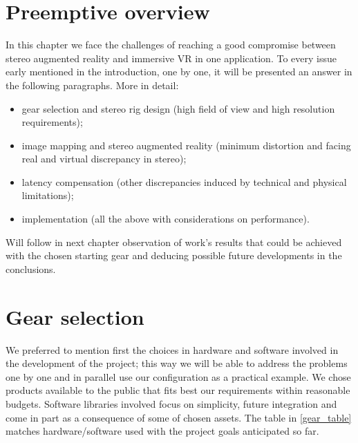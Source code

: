 
\section{Preemptive overview}
In this chapter we face the challenges of reaching a good compromise between stereo augmented reality and immersive VR in one application. To every issue early mentioned in the introduction, one by one, it will be presented an answer in the following paragraphs. More in detail:
\begin{itemize}
\item gear selection and stereo rig design (high field of view and high resolution requirements);
\item image mapping and stereo augmented reality (minimum distortion and facing real and virtual discrepancy in stereo);
\item latency compensation (other discrepancies induced by technical and physical limitations);
\item implementation (all the above with considerations on performance).
\end{itemize}
Will follow in next chapter observation of work's results that could be achieved with the chosen starting gear and deducing possible future developments in the conclusions.

\section{Gear selection}
We preferred to mention first the choices in hardware and software involved in the development of the project; this way we will be able to address the problems one by one and in parallel use our configuration as a practical example. We chose products available to the public that fits best our requirements within reasonable budgets. Software libraries involved focus on simplicity, future integration and come in part as a consequence of some of chosen assets. The table in \ref{gear_table} matches hardware/software used with the project goals anticipated so far.

